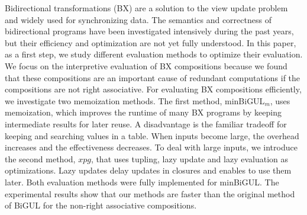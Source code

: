  Bidirectional transformations (BX) are a solution to the view update problem and widely used for synchronizing data. The semantics and correctness of bidirectional programs have been investigated intensively during the past years, but their efficiency and optimization are not yet fully understood. In this paper, as a first step, we study different evaluation methods to optimize their evaluation. We focus on the interpretive evaluation of BX compositions because we found that these compositions are an important cause of redundant computations if the compositions are not right associative. 
 For evaluating BX compositions efficiently, we investigate two memoization methods. The first method, minBiGUL$_m$, uses memoization, which improves the runtime of many BX programs by keeping intermediate results for later reuse. A disadvantage is the familiar tradeoff for keeping and searching values in a table.
  When inputs become large, the overhead increases and the effectiveness decreases. To deal with large inputs, we introduce the second method, $xpg$, that uses tupling, lazy update and lazy evaluation as optimizations. Lazy updates delay updates in closures and enables to use them later.
  Both evaluation methods were fully implemented for minBiGUL. The experimental results show that our methods are faster than the original method of BiGUL for the non-right associative compositions.
